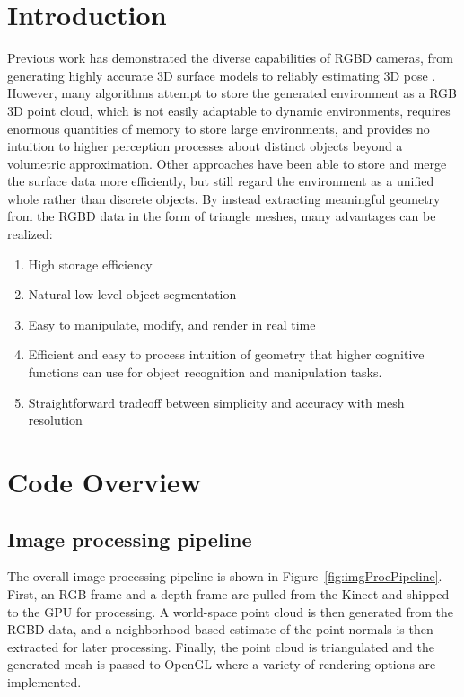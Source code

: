 \documentclass{jcgt}
\begin{document}
\section{Introduction}
\label{sec:introduction}
Previous work has demonstrated the diverse capabilities of RGBD cameras, from generating highly accurate 3D surface models \cite{KinectFusion} to reliably estimating 3D pose \cite{Endres,Taguchi}. However, many algorithms attempt to store the generated environment as a RGB 3D point cloud, which is not easily adaptable to dynamic environments, requires enormous quantities of memory to store large environments, and provides no intuition to higher perception processes about distinct objects beyond a volumetric approximation. Other approaches have been able to store and merge the surface data more efficiently, but still regard the environment as a unified whole rather than discrete objects. By instead extracting meaningful geometry from the RGBD data in the form of triangle meshes, many advantages can be realized:

\begin{enumerate}
\item High storage efficiency
\item Natural low level object segmentation
\item Easy to manipulate, modify, and render in real time
\item Efficient and easy to process intuition of geometry that higher cognitive functions can use for object recognition and manipulation tasks.
\item Straightforward tradeoff between simplicity and accuracy with mesh resolution
\end{enumerate}

\section{Code Overview}
\subsection{Image processing pipeline}
The overall image processing pipeline is shown in Figure~\ref{fig:imgProcPipeline}. First, an RGB frame and a depth frame are pulled from the Kinect and shipped to the GPU for processing. A world-space point cloud is then generated from the RGBD data, and a neighborhood-based estimate of the point normals is then extracted for later processing. Finally, the point cloud is triangulated and the generated mesh is passed to OpenGL where a variety of rendering options are implemented.
\end{document}
